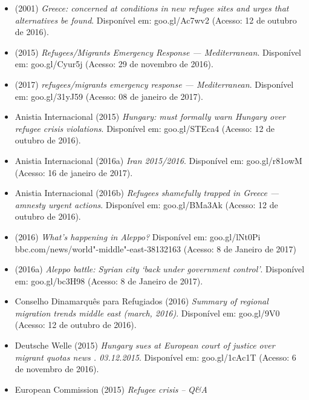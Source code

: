 

\begingroup

\small
\begin{itemize}
\item
   (2001) \emph{Greece:  concerned at conditions in new
  refugee sites and urges that alternatives be found}. Disponível em:
  goo.gl/Ac7wv2 (Acesso: 12 de outubro de 2016).
\item
   (2015) \emph{Refugees/Migrants Emergency Response ---
  Mediterranean}. Disponível em: goo.gl/Cyur5j (Acesso: 29 de novembro
  de 2016).
\item
   (2017) \emph{ refugees/migrants emergency response ---
  Mediterranean}. Disponível em: goo.gl/31yJ59 (Acesso: 08 de janeiro de
  2017).
\item
  Anistia Internacional (2015) \emph{Hungary:  must formally warn
  Hungary over refugee crisis violations}. Disponível em: goo.gl/{STE}ca4
  (Acesso: 12 de outubro de 2016).
\item
  Anistia Internacional (2016a) \emph{Iran 2015/2016}. Disponível em:
  goo.gl/r81owM (Acesso: 16 de janeiro de 2017).
\item
  Anistia Internacional (2016b) \emph{Refugees shamefully trapped in
  Greece ---} \emph{amnesty urgent actions}. Disponível em:
  goo.gl/{BM}a3Ak (Acesso: 12 de outubro de 2016).
\item
   (2016) \emph{What}\emph{'}\emph{s happening in Aleppo?} Disponível
  em: goo.gl/lNt0Pi
  bbc.com/news/world"-middle"-east-38132163 
  (Acesso: 8 de Janeiro de 2017)
\item
   (2016a) \emph{Aleppo battle: Syrian city} \emph{`}\emph{back under
  government control}\emph{'}. Disponível em: goo.gl/bc3H98 (Acesso: 8
  de Janeiro de 2017).
\item
  Conselho Dinamarquês para Refugiados (2016) \emph{Summary of regional
  migration trends middle east (march, 2016)}. Disponível em:
  goo.gl/9V0 (Acesso: 12 de outubro de 2016).
\item
  Deutsche Welle (2015) \emph{Hungary sues  at European court of
  justice over migrant quotas \textbar{} news \textbar{} .
  \textbar{} 03.12.2015}. Disponível em: goo.gl/1cAc1T (Acesso: 6 de
  novembro de 2016).
\item
  European Commission (2015) \emph{Refugee crisis} \emph{--} \emph{Q\&A
}
\end{itemize}
